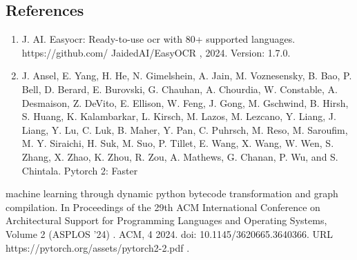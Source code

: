 \subsection{References}

\begin{enumerate}
\item J. AI. Easyocr: Ready-to-use ocr with 80+ supported languages. https://github.com/ JaidedAI/EasyOCR , 2024. Version: 1.7.0.
\item J. Ansel, E. Yang, H. He, N. Gimelshein, A. Jain, M. Voznesensky, B. Bao, P. Bell, D. Berard, E. Burovski, G. Chauhan, A. Chourdia, W. Constable, A. Desmaison, Z. DeVito, E. Ellison, W. Feng, J. Gong, M. Gschwind, B. Hirsh, S. Huang, K. Kalambarkar, L. Kirsch, M. Lazos, M. Lezcano, Y. Liang, J. Liang, Y. Lu, C. Luk, B. Maher, Y. Pan, C. Puhrsch, M. Reso, M. Saroufim, M. Y. Siraichi, H. Suk, M. Suo, P. Tillet, E. Wang, X. Wang, W. Wen, S. Zhang, X. Zhao, K. Zhou, R. Zou, A. Mathews, G. Chanan, P. Wu, and S. Chintala. Pytorch 2: Faster
\end{enumerate}

machine learning through dynamic python bytecode transformation and graph compilation. In Proceedings of the 29th ACM International Conference on Architectural Support for Programming Languages and Operating Systems, Volume 2 (ASPLOS '24) . ACM, 4 2024. doi: 10.1145/3620665.3640366. URL https://pytorch.org/assets/pytorch2-2.pdf .

